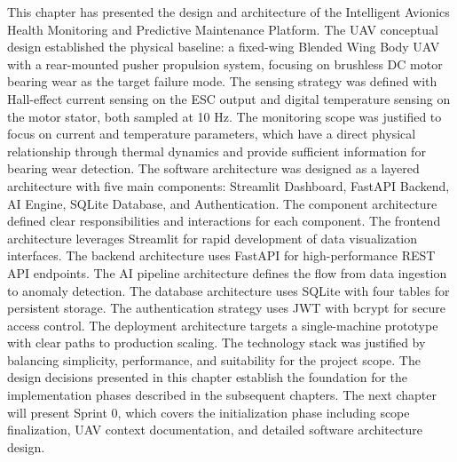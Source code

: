 This chapter has presented the design and architecture of the Intelligent Avionics Health Monitoring and Predictive Maintenance Platform. The UAV conceptual design established the physical baseline: a fixed-wing Blended Wing Body UAV with a rear-mounted pusher propulsion system, focusing on brushless DC motor bearing wear as the target failure mode. The sensing strategy was defined with Hall-effect current sensing on the ESC output and digital temperature sensing on the motor stator, both sampled at 10 Hz. The monitoring scope was justified to focus on current and temperature parameters, which have a direct physical relationship through thermal dynamics and provide sufficient information for bearing wear detection. The software architecture was designed as a layered architecture with five main components: Streamlit Dashboard, FastAPI Backend, AI Engine, SQLite Database, and Authentication. The component architecture defined clear responsibilities and interactions for each component. The frontend architecture leverages Streamlit for rapid development of data visualization interfaces. The backend architecture uses FastAPI for high-performance REST API endpoints. The AI pipeline architecture defines the flow from data ingestion to anomaly detection. The database architecture uses SQLite with four tables for persistent storage. The authentication strategy uses JWT with bcrypt for secure access control. The deployment architecture targets a single-machine prototype with clear paths to production scaling. The technology stack was justified by balancing simplicity, performance, and suitability for the project scope. The design decisions presented in this chapter establish the foundation for the implementation phases described in the subsequent chapters. The next chapter will present Sprint 0, which covers the initialization phase including scope finalization, UAV context documentation, and detailed software architecture design.
